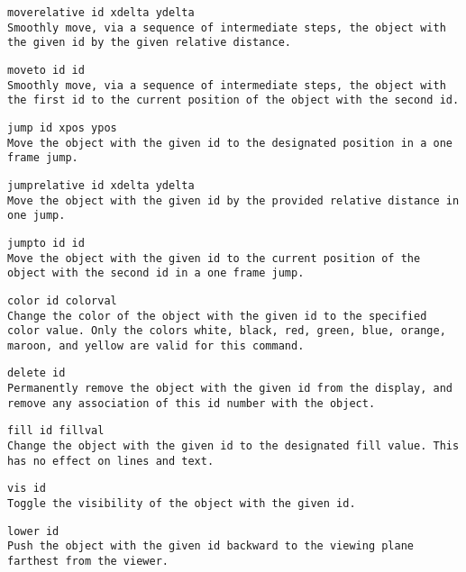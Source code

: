 \quest
\tt moverelative id xdelta ydelta\\
\hspace*{3ex} \rm Smoothly move, via a sequence of intermediate steps,
the object with the given id by the given relative distance.

\quest
\tt moveto id id\\
\hspace*{3ex} \rm Smoothly move, via a sequence of intermediate steps,
the object with the first id to the current position of the object
with the second id.

\quest
\tt jump id xpos ypos\\
\hspace*{3ex} \rm Move the object with the given id to the designated
position in a one frame jump.

\quest
\tt jumprelative id xdelta ydelta\\
\hspace*{3ex} \rm Move the object with the given id by the provided
relative distance in one jump.

\quest
\tt jumpto id id\\
\hspace*{3ex} \rm Move the object with the given id to the current
position of the object with the second id in a one frame jump.

\quest
\tt color id colorval\\
\hspace*{3ex} \rm Change the color of the object with the given id to
the specified color value.  Only the colors white, black, red, green,
blue, orange, maroon, and yellow are valid for this command.

\quest
\tt delete id\\
\hspace*{3ex} \rm Permanently remove the object with the given id from
the display, and remove any association of this id number with the object.

\quest
\tt fill id fillval\\
\hspace*{3ex} \rm Change the object with the given id to the
designated fill value.  This has no effect on lines and text.

\quest
\tt vis id\\
\hspace*{3ex} \rm  Toggle the visibility of the object with the given
id.

\quest
\tt lower id\\
\hspace*{3ex} \rm  Push the object with the given id backward to the viewing
plane farthest from the viewer.


